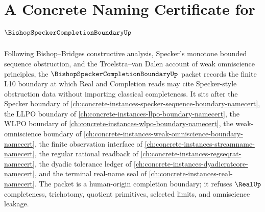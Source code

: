 \chapter{A Concrete Naming Certificate for $\BishopSpeckerCompletionBoundaryUp$}
\label{ch:concrete-instances-bishop-specker-completion-boundary-namecert}

Following Bishop--Bridges constructive analysis, Specker's monotone bounded sequence obstruction, and the Troelstra--van Dalen account of weak omniscience principles, the $\BishopSpeckerCompletionBoundaryUp$ packet records the finite L10 boundary at which Real and Completion reads may cite Specker-style obstruction data without importing classical completeness. It sits after the Specker boundary of \autoref{ch:concrete-instances-specker-sequence-boundary-namecert}, the LLPO boundary of \autoref{ch:concrete-instances-llpo-boundary-namecert}, the WLPO boundary of \autoref{ch:concrete-instances-wlpo-boundary-namecert}, the weak-omniscience boundary of \autoref{ch:concrete-instances-weak-omniscience-boundary-namecert}, the finite observation interface of \autoref{ch:concrete-instances-streamname-namecert}, the regular rational readback of \autoref{ch:concrete-instances-regseqrat-namecert}, the dyadic tolerance ledger of \autoref{ch:concrete-instances-dyadicratcore-namecert}, and the terminal real-name seal of \autoref{ch:concrete-instances-real-namecert}. The packet is a human-origin completion boundary; it refuses $\RealUp$ completeness, trichotomy, quotient primitives, selected limits, and omniscience leakage.

